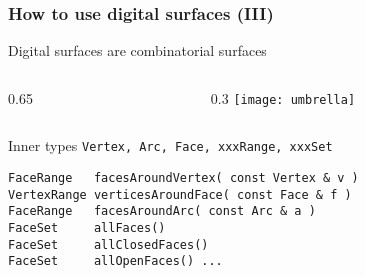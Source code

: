 \documentclass[pdftex,francais]{beamer}
\newenvironment{myblocklbluish}[2]%
	       {\begin{beamerboxesrounded}[lower=qcolorlb,upper=qcolorulb,width=#1,shadow=true]{#2}}{\end{beamerboxesrounded}}
\begin{document}
\begin{frame}[fragile]%
  \frametitle{How to use digital surfaces (III)}

    \begin{myblocklbluish}{\textwidth}{Digital surfaces are combinatorial surfaces}
      \begin{columns}
        \begin{column}{0.65\textwidth}
        \end{column}
        \begin{column}{0.3\textwidth}
          \texttt{[image: umbrella]}
        \end{column}
      \end{columns}
    \end{myblocklbluish}

      Inner types \alert{\tt Vertex, Arc, Face, xxxRange, xxxSet}
      \begin{lstlisting}
FaceRange   facesAroundVertex( const Vertex & v ) 
VertexRange verticesAroundFace( const Face & f )
FaceRange   facesAroundArc( const Arc & a )
FaceSet     allFaces()
FaceSet     allClosedFaces()
FaceSet     allOpenFaces() ...
      \end{lstlisting}
    
\end{frame}
\end{document}
